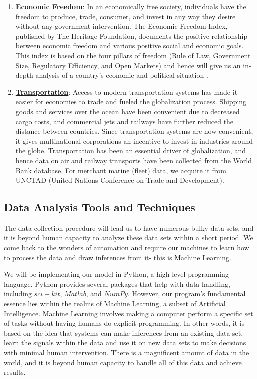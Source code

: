 \documentclass[12pt,oneside]{book} %
\begin{document}
\begin{enumerate}
\item \underline{\textbf{Economic Freedom}}: In an economically free society, individuals have the freedom to produce, trade, consumer, and invest in any way they desire without any government intervention. The Economic Freedom Index, published by The Heritage Foundation, documents the positive relationship between economic freedom and various positive social and economic goals. This index is based on the four pillars of freedom (Rule of Law, Government Size, Regulatory Efficiency, and Open Markets) and hence will give us an in-depth analysis of a country's economic and political situation \cite{miller20102010}.

\item \underline{\textbf{Transportation}}: Access to modern transportation systems has made it easier for economies to trade and fueled the globalization process. Shipping goods and services over the ocean have been convenient due to decreased cargo costs, and commercial jets and railways have further reduced the distance between countries. Since transportation systems are now convenient, it gives multinational corporations an incentive to invest in industries around the globe. Transportation has been an essential driver of globalization, and hence data on air and railway transports have been collected from the World Bank database. For merchant marine (fleet) data, we acquire it from UNCTAD (United Nations Conference on Trade and Development).

\end{enumerate}

\subsection{Data Analysis Tools and Techniques}
\hspace{20pt}The data collection procedure will lead us to have numerous bulky data sets, and it is beyond human capacity to analyze these data sets within a short period. We come back to the wonders of automation and require our machines to learn how to process the data and draw inferences from it- this is Machine Learning.

We will be implementing our model in Python, a high-level programming language. Python provides several packages that help with data handling, including $sci-kit$, $Matlab$, and $NumPy$. However, our program's fundamental essence lies within the realms of Machine Learning, a subset of Artificial Intelligence. Machine Learning involves making a computer perform a specific set of tasks without having humans do explicit programming. In other words, it is based on the idea that systems can make inferences from an existing data set, learn the signals within the data and use it on new data sets to make decisions with minimal human intervention. There is a magnificent amount of data in the world, and it is beyond human capacity to handle all of this data and achieve results.
\end{document}
